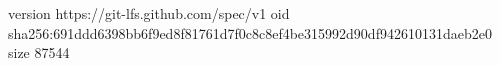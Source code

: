 version https://git-lfs.github.com/spec/v1
oid sha256:691ddd6398bb6f9ed8f81761d7f0c8c8ef4be315992d90df942610131daeb2e0
size 87544
